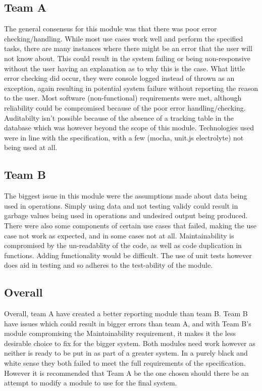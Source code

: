\subsection{Team A}
The general consensus for this module was that there was poor error checking/handling. While most use cases work well and perform the specified tasks, there are many instances where there might be an error that the user will not know about. This could result in the system failing or being non-responsive without the user having an explanation as to why this is the case. What little error checking did occur, they were console logged instead of thrown as an exception, again resulting in potential system failure without reporting the reason to the user.
\newline \newline
Most software (non-functional) requirements were met, although reliability could be compromised because of the poor error handling/checking. Auditabilty isn't possible because of the absence of a tracking table in the database which was however beyond the scope of this module. 
\newline \newline
Technologies used were in line with the specification, with a few (mocha, unit.js electrolyte) not being used at all.

\subsection{Team B}
The biggest issue in this module were the assumptions made about data being used in operations. Simply using data and not testing validy could result in garbage values being used in operations and undesired output being produced. There were also some components of certain use cases that failed, making the use case not work as expected, and in some cases not at all.
\newline \newline
Maintainability is compromised by the un-readablity of the code, as well as code duplication in functions. Adding functionality would be difficult. The use of unit tests however does aid in testing and so adheres to the test-ability of the module.   

\subsection{Overall}
Overall, team A have created a better reporting module than team B. Team B have issues which could result in bigger errors than team A, and with Team B's module compromising the Maintainability requirement, it makes it the less desirable choice to fix for the bigger system. 
\newline \newline
Both modules need work however as neither is ready to be put in as part of a greater system. In a purely black and white sense they both failed to meet the full requirements of the specification. However it is recommended that Team A be the one chosen should there be an attempt to modify a module to use for the final system. 